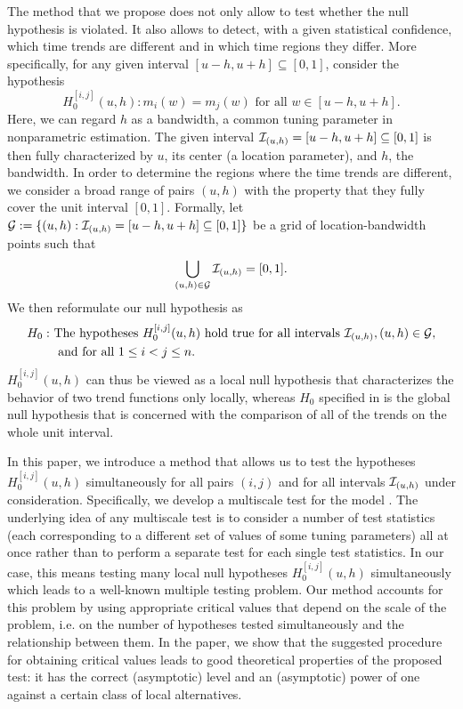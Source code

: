 \documentclass[a4paper,12pt]{article}
\makeatletter
\renewcommand{\eqref}[1]{\tagform@{\ref{#1}}}
\makeatother
\begin{document}
The method that we propose does not only allow to test whether the null hypothesis is violated. It also allows to detect, with a given statistical confidence, which time trends are different and in which time regions they differ. More specifically, for any given interval $[u-h,u+h] \subseteq [0,1]$, consider the hypothesis
\[ H_0^{[i,j]}(u,h): m_i(w) = m_j(w) \text{ for all } w \in [u-h,u+h]. \] 
Here, we can regard $h$ as a bandwidth, a common tuning parameter in nonparametric estimation. The given interval $\mathcal{I}_{(u, h)} = [u-h,u+h] \subseteq [0,1]$ is then fully characterized by $u$, its center (a location parameter), and $h$, the bandwidth. In order to determine the regions where the time trends are different, we consider a broad range of pairs $(u, h)$ with the property that they fully cover the unit interval $[0, 1]$. Formally, let \linebreak $\mathcal{G} := \{(u, h): \mathcal{I}_{(u, h)} = [u-h, u+h] \subseteq [0,1]\}$ be a grid of location-bandwidth points such that 
\begin{align*}
\bigcup_{(u, h) \in \mathcal{G}}  \mathcal{I}_{(u, h)} = [0,1].
\end{align*}
We then reformulate our null hypothesis \eqref{eq:null} as
\begin{align*}
H_0: \ & \text{The hypotheses } H_0^{[i,j]}(u,h) \text{ hold true for all intervals }  \mathcal{I}_{(u, h)}, (u, h) \in \mathcal{G}, \\ & \text{ and for all } 1 \le i < j \le n. 
\end{align*} 
$H_0^{[i,j]}(u,h)$ can thus be viewed as a local null hypothesis that characterizes the behavior of two trend functions only locally, whereas $H_0$ specified in \eqref{eq:null} is the global null hypothesis that is concerned with the comparison of all of the trends on the whole unit interval.

In this paper, we introduce a method that allows us to test the hypotheses $H_0^{[i,j]}(u,h)$  simultaneously for all pairs $(i, j)$ and for all intervals $\mathcal{I}_{(u, h)}$ under consideration. Specifically, we develop a multiscale test for the model \eqref{eq:model}. The underlying idea of any multiscale test is to consider a number of test statistics (each corresponding to a different set of values of some tuning parameters) all at once rather than to perform a separate test for each single test statistics. In our case, this means testing many local null hypotheses $H_0^{[i,j]}(u,h)$ simultaneously which leads to a well-known multiple testing problem. Our method accounts for this problem by using appropriate critical values that depend on the scale of the problem, i.e. on the number of hypotheses tested simultaneously and the relationship between them. In the paper, we show that the suggested procedure for obtaining critical values leads to good theoretical properties of the proposed test: it has the correct (asymptotic) level and an (asymptotic) power of one against a certain class of local alternatives. %
\end{document}
